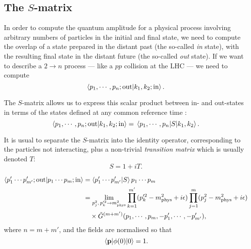 \documentclass{article}
\numberwithin{equation}{section}
\begin{document}
\subsection{The $S$-matrix}

In order to compute the quantum amplitude for a physical process involving arbitrary numbers of particles in the initial and final state, we need to compute the overlap of a state prepared in the distant past (the so-called \textit{in} state), with the resulting final state in the distant future (the so-called \textit{out} state). If we want to describe a $2 \rightarrow n$ process --- like a $pp$ collision at the LHC --- we need to compute 
\begin{equation}
    \braket{p_1, \cdots , p_n; \text{out}}{k_1, k_2; \text{in}}.
\end{equation}

The $S$-matrix allows us to express this scalar product between in- and out-states in terms of the states defined at any common reference time :
\begin{equation}
    \braket{p_1, \cdots , p_n; \text{out}}{k_1, k_2; \text{in}} = \mel{p_1, \cdots , p_n}{S}{k_1, k_2}.
\end{equation}

It is usual to separate the $S$-matrix into the identity operator, corresponding to the particles not interacting, plus a non-trivial \textit{transition matrix} which is usually denoted $T$:
\begin{equation}
    S = 1 + iT.
\end{equation}

\begin{equation}
\begin{aligned}
    \braket{p'_1 \cdots p'_{m'}; \text{out}}{p_1 \cdots p_m; \text{in}} &= \braket{p'_1 \cdots p'_{m'}}{S}{p_1 \cdots p_m} \\
    &= \lim_{p_j^2, \, p_k^{\prime 2} \rightarrow m_{\text{phys}}^2} \prod_{k=1}^{m'} (p_k^{\prime 2} - m_{\text{phys}}^2 + i\epsilon) \prod_{j=1}^{m} (p_j^2 - m_{\text{phys}}^2 + i\epsilon) \\
    & \quad \times \tilde{G}^{(m+m')} (p_1, \cdots, p_m, -p'_1, \cdots, -p'_{m'}),
\end{aligned}
\end{equation}  
where $n=m + m'$, and the fields are normalised so that
\begin{equation}
    \mel{\vb{p}}{\phi(0)}{0} = 1.
\end{equation}
\end{document}
